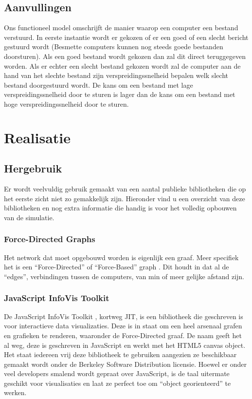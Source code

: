 \documentclass[a4paper,oneside]{report}
\begin{document}
\newpage
\section{Aanvullingen}
Ons functioneel model omschrijft de manier waarop een computer een bestand verstuurd. In eerste instantie wordt er gekozen of 
er een goed of een slecht bericht gestuurd wordt (Besmette computers kunnen nog steeds goede bestanden doorsturen). Als een goed
bestand wordt gekozen dan zal dit direct teruggegeven worden. Als er echter een slecht bestand gekozen wordt zal de computer aan de 
hand van het slechte bestand zijn verspreidingssnelheid bepalen welk slecht bestand doorgestuurd wordt. De kans om een bestand met 
lage verspreidingssnelheid door te sturen is lager dan de kans om een bestand met hoge verspreidingssnelheid door te sturen.
\eindlemma


\chapter{Realisatie}
\section{Hergebruik}
Er wordt veelvuldig gebruik gemaakt van een aantal publieke bibliotheken die op het eerste
zicht niet zo gemakkelijk zijn. Hieronder vind u een overzicht van deze bibliotheken en nog
extra informatie die handig is voor het volledig opbouwen van de simulatie.
\subsection{Force-Directed Graphs}
Het network dat moet opgebouwd worden is eigenlijk een graaf. Meer specifiek het is een
``Force-Directed'' of ``Force-Based'' graph \cite{ForceBasedGraph}.
Dit houdt in dat al de ``edges'', verbindingen tussen de computers, van min of meer gelijke afstand zijn.
\subsection{JavaScript InfoVis Toolkit}
De JavaScript InfoVis Toolkit \cite{InfoVis}, kortweg JIT, is een bibliotheek die geschreven is voor interactieve
data visualizaties. Deze is in staat om een heel arsenaal grafen en grafieken te renderen, waaronder
de Force-Directed graaf.
De naam geeft het al weg, deze is geschreven in JavaScript en werkt met het HTML5 canvas object.
Het staat iedereen vrij deze bibliotheek te gebruiken aangezien ze beschikbaar gemaakt wordt onder
de Berkeley Software Distribution licensie.
Hoewel er onder veel developers smalend wordt gepraat over JavaScript, is de taal uitermate geschikt voor visualisaties
en laat ze perfect toe om ``object georienteerd'' te werken.
\end{document}
